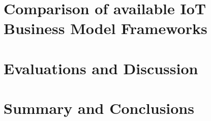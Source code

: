 \section{Comparison of available IoT Business Model Frameworks}

\section{Evaluations and Discussion}

\section{Summary and Conclusions}

